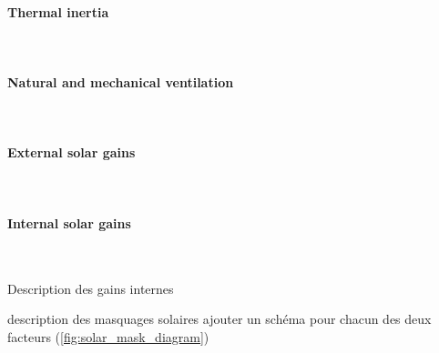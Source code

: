 \documentclass[11pt]{article}
\begin{document}

            \paragraph{Thermal inertia}\mbox{}\\ %
            \label{par:thermal_inertia}
            

            \paragraph{Natural and mechanical ventilation}\mbox{}\\ %
            \label{par:natural_and_mechanical_ventilation}
            

            \paragraph{External solar gains}\mbox{}\\ %
            \label{par:external_solar_gains}
            


            \paragraph{Internal solar gains}\mbox{}\\ %
            \label{par:internal_solar_gains}

            Description des gains internes 

            description des masquages solaires
            ajouter un schéma pour chacun des deux facteurs (\ref{fig:solar_mask_diagram})
\end{document}
